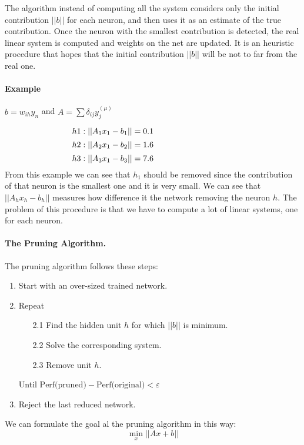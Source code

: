 The  algorithm instead of computing all the system considers only the initial contribution $||b||$ for each neuron, and then uses it as an estimate of the true contribution. Once the neuron with the smallest contribution is detected, the real linear system is computed and weights on the net are updated. It is an heuristic procedure that hopes that the initial contribution $||b||$ will be not to far from the real one.

\paragraph{Example} $b = w_{ih}y_n$ and $A= \sum\delta_{ij}y_j^{(\mu)}$

$$h1: \vert \vert A_1x_1 - b_1 \vert \vert  = 0.1 \hspace{9.7em} $$
$$h2: \vert \vert A_2x_1 - b_2 \vert \vert  = 1.6 \hspace{9.7em} $$
$$h3: \vert \vert A_3x_1 - b_3 \vert \vert  = 7.6 \hspace{9.7em} $$
From this example we can see that $h_1$ should be removed since the contribution of that neuron is the smallest one and it is very small. We can see that $ \vert \vert A_hx_h - b_h\vert \vert$ measures how difference it the network removing the neuron $h$.
The problem of this procedure is that we have to compute a lot of linear systems, one for each neuron.



\paragraph*{The Pruning Algorithm.}
The pruning algorithm follows these steps:
\begin{enumerate}
	\item Start with an over-sized trained network.
	\item Repeat
	\begin{enumerate}
		\item[2.1] Find the hidden unit $h$ for which $\vert \vert b \vert \vert$ is minimum.
		\item[2.2] Solve the corresponding system.
		\item[2.3] Remove unit $h$.
	\end{enumerate}
	Until $\text{Perf(pruned)} - \text{Perf(original)} < \varepsilon$
	\item Reject the last reduced network.
\end{enumerate}
We can formulate the goal al the pruning algorithm in this way:
$$\min_x \vert\vert Ax + b \vert\vert$$
